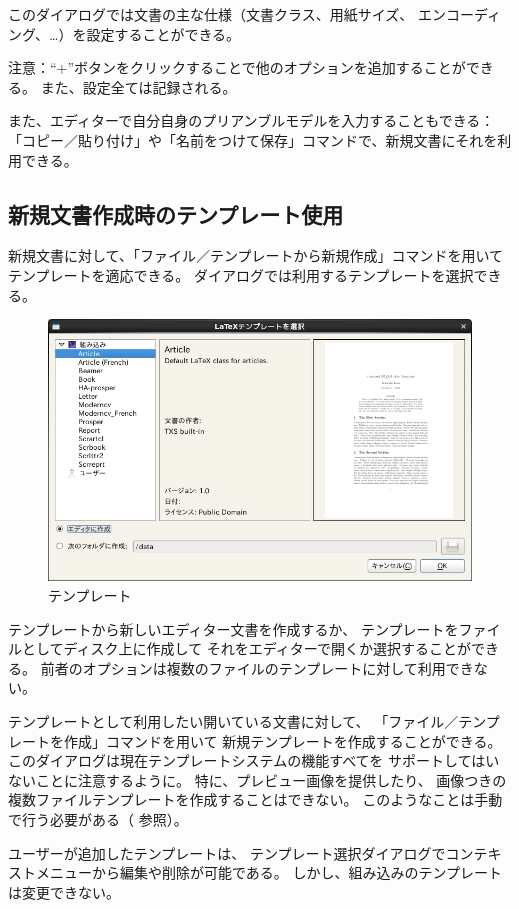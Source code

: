 このダイアログでは文書の主な仕様（文書クラス、用紙サイズ、
エンコーディング、…）を設定することができる。

注意：``+''ボタンをクリックすることで他のオプションを追加することができる。
また、設定全ては記録される。

また、エディターで自分自身のプリアンブルモデルを入力することもできる：
「コピー／貼り付け」や「名前をつけて保存」コマンドで、新規文書にそれを利用できる。

\subsection{新規文書作成時のテンプレート使用}

新規文書に対して、「ファイル／テンプレートから新規作成」コマンドを用いて
テンプレートを適応できる。
ダイアログでは利用するテンプレートを選択できる。

\begin{figure}[H]
  \centering
  \includegraphics[width=.8\linewidth]{template.png}
  \caption{テンプレート}
\end{figure}

テンプレートから新しいエディター文書を作成するか、
テンプレートをファイルとしてディスク上に作成して
それをエディターで開くか選択することができる。
前者のオプションは複数のファイルのテンプレートに対して利用できない。

テンプレートとして利用したい開いている文書に対して、
「ファイル／テンプレートを作成」コマンドを用いて
新規テンプレートを作成することができる。
このダイアログは現在テンプレートシステムの機能すべてを
サポートしてはいないことに注意するように。
特に、プレビュー画像を提供したり、
画像つきの複数ファイルテンプレートを作成することはできない。
このようなことは手動で行う必要がある（
参照）。

ユーザーが追加したテンプレートは、
テンプレート選択ダイアログでコンテキストメニューから編集や削除が可能である。
しかし、組み込みのテンプレートは変更できない。

